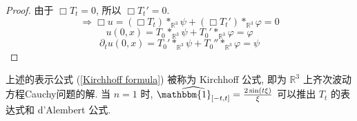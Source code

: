 \documentclass[11pt]{ctexart}[UTF8]
\begin{document}
\begin{proof}
    由于 $\Box T_{t} = 0$, 所以 $\Box T_{t}'=0$.
    \begin{equation*}
        \Longrightarrow \Box u = (\Box T_{t}) \ast_{\mathbb{R}^{3}} \psi + (\Box T_{t}') \ast_{\mathbb{R}^{3}} \varphi = 0
    \end{equation*}
    \begin{equation*}
        u(0,x) = T_{0} \ast_{\mathbb{R}^{3}} \psi + T_{0}' \ast_{\mathbb{R}^{3}} \varphi = \varphi
    \end{equation*}
    \begin{equation*}
        \partial_{t} u(0,x) = T_{0}' \ast_{\mathbb{R}^{3}} \psi + T_{0}'' \ast_{\mathbb{R}^{3}} \varphi = \psi
    \end{equation*}
\end{proof}
\begin{remark}
    上述的表示公式 (\ref{Kirchhoff formula}) 被称为 Kirchhoff 公式, 即为 $\mathbb{R}^{3}$ 上齐次波动方程Cauchy问题的解.
    当 $n=1$ 时, $\widehat{\mathbbm{1}_{[-t,t]}} = \frac{2\sin(t\xi)}{\xi}$ 可以推出 $T_{t}$ 的表达式和 d'Alembert 公式.
\end{remark}
\end{document}
